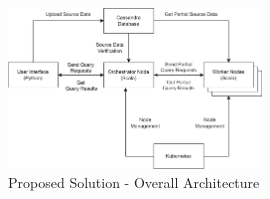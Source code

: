 \begin{figure}[h]
	\centering
	\includegraphics[width=0.6\textwidth]{chapters/diagrams/design/architecture-overall}
	\caption{Proposed Solution - Overall Architecture}
	\label{fig:overall-architecture}
\end{figure}

